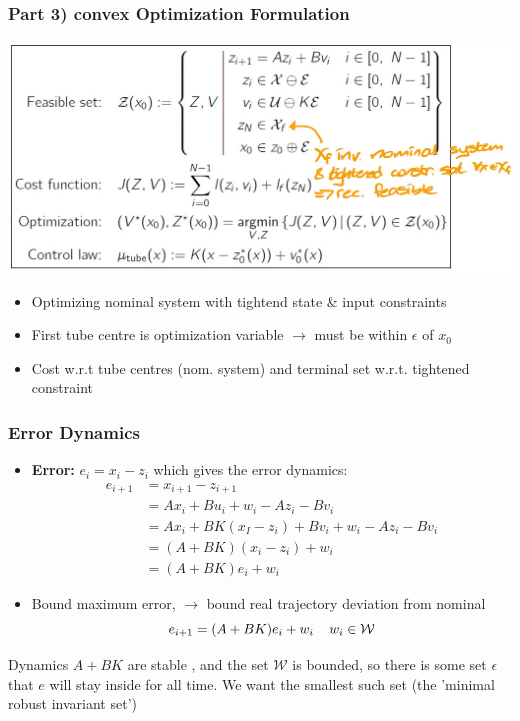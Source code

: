 \subsubsection{Part 3) convex Optimization Formulation}
\includegraphics[width=0.99\linewidth]{MPC_summary/Images/Convex_optmization.jpg}
\begin{itemize}
    \item Optimizing nominal system with tightend state \& input constraints
    \item First tube centre is optimization variable $\rightarrow$ must be within $\epsilon$ of $x_0$
    \item Cost w.r.t tube centres (nom. system) and terminal set w.r.t. tightened constraint
\end{itemize}
\subsubsection{Error Dynamics}
\begin{itemize}
    \item \textbf{Error:} $e_i = x_i-z_i$ which gives the error dynamics:
        \begin{align*}
            e_{i+1} &= x_{i+1}-z_{i+1}\\
            &= Ax_i+Bu_i +w_i - Az_i -Bv_i\\
            &= Ax_i +BK(x_I-z_i)+Bv_i+w_i -Az_i-Bv_i\\
            &=(A+BK)(x_i-z_i)+w_i\\
            &=(A+BK)e_i+w_i
        \end{align*}
    \item Bound maximum error, $\rightarrow$ bound real trajectory deviation from nominal
        \[e_{i+1} = (A+BK)e_i+w_i \hspace{4mm} w_i\in \mathcal{W}\]
\end{itemize}

Dynamics $A+BK$ are stable , and the set $\mathcal{W}$ is bounded, so there is some set $\epsilon$ that $e$ will stay inside for all time. We want the smallest such set (the 'minimal robust invariant set')
